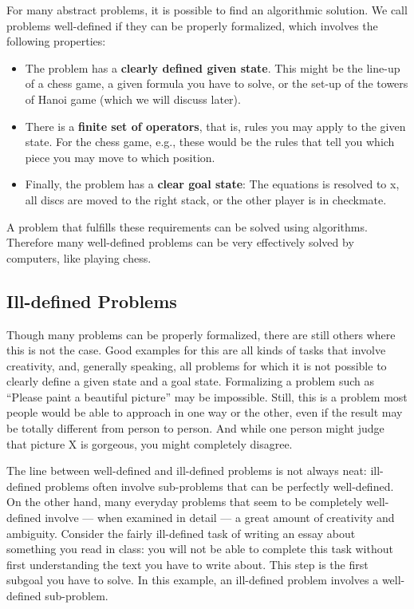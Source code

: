 \documentclass[
]{krantz}
\begin{document}
For many abstract problems, it is possible to find an algorithmic solution. We call problems well-defined if they can be properly formalized, which involves the following properties:

\begin{itemize}
\item
  The problem has a \textbf{clearly defined given state}. This might be the line-up of a chess game, a given formula you have to solve, or the set-up of the towers of Hanoi game (which we will discuss later).
\item
  There is a \textbf{finite set of operators}, that is, rules you may apply to the given state. For the chess game, e.g., these would be the rules that tell you which piece you may move to which position.
\item
  Finally, the problem has a \textbf{clear goal state}: The equations is resolved to x, all discs are moved to the right stack, or the other player is in checkmate.
\end{itemize}

A problem that fulfills these requirements can be solved using algorithms. Therefore many well-defined problems can be very effectively solved by computers, like playing chess.

\hypertarget{ill-defined-problems}{%
\subsection*{Ill-defined Problems}\label{ill-defined-problems}}


Though many problems can be properly formalized, there are still others where this is not the case. Good examples for this are all kinds of tasks that involve creativity, and, generally speaking, all problems for which it is not possible to clearly define a given state and a goal state. Formalizing a problem such as ``Please paint a beautiful picture'' may be impossible. Still, this is a problem most people would be able to approach in one way or the other, even if the result may be totally different from person to person. And while one person might judge that picture X is gorgeous, you might completely disagree.

The line between well-defined and ill-defined problems is not always neat: ill-defined problems often involve sub-problems that can be perfectly well-defined. On the other hand, many everyday problems that seem to be completely well-defined involve --- when examined in detail --- a great amount of creativity and ambiguity. Consider the fairly ill-defined task of writing an essay about something you read in class: you will not be able to complete this task without first understanding the text you have to write about. This step is the first subgoal you have to solve. In this example, an ill-defined problem involves a well-defined sub-problem.
\end{document}
